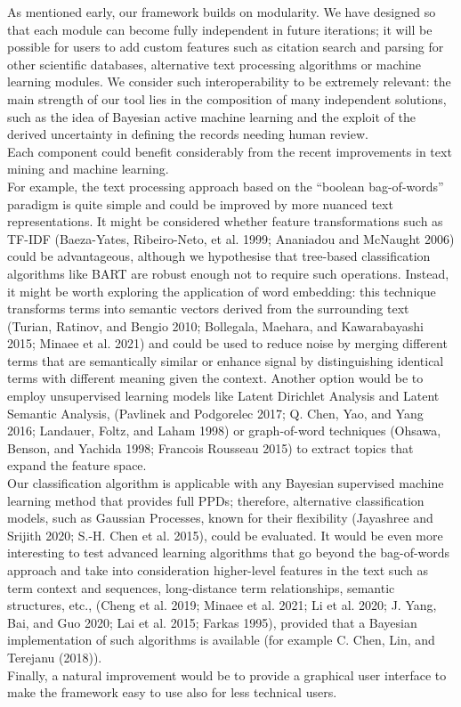 \documentclass{article}
\begin{document}
As mentioned early, our framework builds on modularity. We have designed
so that each module can become fully independent in future iterations;
it will be possible for users to add custom features such as citation
search and parsing for other scientific databases, alternative text
processing algorithms or machine learning modules. We consider such
interoperability to be extremely relevant: the main strength of our tool
lies in the composition of many independent solutions, such as the idea
of Bayesian active machine learning and the exploit of the derived
uncertainty in defining the records needing human review.\\
Each component could benefit considerably from the recent improvements
in text mining and machine learning.\\
For example, the text processing approach based on the ``boolean
bag-of-words'' paradigm is quite simple and could be improved by more
nuanced text representations. It might be considered whether feature
transformations such as TF-IDF (Baeza-Yates, Ribeiro-Neto, et al. 1999;
Ananiadou and McNaught 2006) could be advantageous, although we
hypothesise that tree-based classification algorithms like BART are
robust enough not to require such operations. Instead, it might be worth
exploring the application of word embedding: this technique transforms
terms into semantic vectors derived from the surrounding text (Turian,
Ratinov, and Bengio 2010; Bollegala, Maehara, and Kawarabayashi 2015;
Minaee et al. 2021) and could be used to reduce noise by merging
different terms that are semantically similar or enhance signal by
distinguishing identical terms with different meaning given the context.
Another option would be to employ unsupervised learning models like
Latent Dirichlet Analysis and Latent Semantic Analysis, (Pavlinek and
Podgorelec 2017; Q. Chen, Yao, and Yang 2016; Landauer, Foltz, and Laham
1998) or graph-of-word techniques (Ohsawa, Benson, and Yachida 1998;
Francois Rousseau 2015) to extract topics that expand the feature
space.\\
Our classification algorithm is applicable with any Bayesian supervised
machine learning method that provides full PPDs; therefore, alternative
classification models, such as Gaussian Processes, known for their
flexibility (Jayashree and Srijith 2020; S.-H. Chen et al. 2015), could
be evaluated. It would be even more interesting to test advanced
learning algorithms that go beyond the bag-of-words approach and take
into consideration higher-level features in the text such as term
context and sequences, long-distance term relationships, semantic
structures, etc., (Cheng et al. 2019; Minaee et al. 2021; Li et al.
2020; J. Yang, Bai, and Guo 2020; Lai et al. 2015; Farkas 1995),
provided that a Bayesian implementation of such algorithms is available
(for example C. Chen, Lin, and Terejanu (2018)).\\
Finally, a natural improvement would be to provide a graphical user
interface to make the framework easy to use also for less technical
users.
\end{document}
